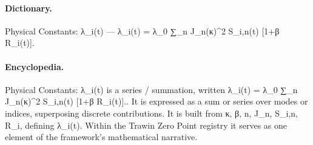 \paragraph{Dictionary.}
Physical Constants: λ\_i(t) — λ\_i(t) = λ\_0 ∑\_n J\_n(κ)\textasciicircum{}2 S\_i,n(t) [1+β R\_i(t)].

\paragraph{Encyclopedia.}
Physical Constants: λ\_i(t) is a series / summation, written λ\_i(t) = λ\_0 ∑\_n J\_n(κ)\textasciicircum{}2 S\_i,n(t) [1+β R\_i(t)].. It is expressed as a sum or series over modes or indices, superposing discrete contributions. It is built from κ, β, n, J\_n, S\_i,n, R\_i, defining λ\_i(t). Within the Trawin Zero Point registry it serves as one element of the framework's mathematical narrative.
